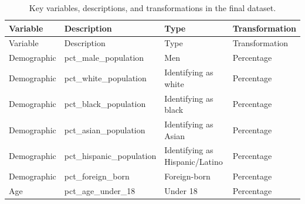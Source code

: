 \documentclass[
  number,
  review,
  3p]{elsarticle}
\begin{document}
\begin{longtable}[]{@{}
  >{\raggedright\arraybackslash}p{}
  >{\raggedright\arraybackslash}p{}
  >{\raggedright\arraybackslash}p{}
  >{\raggedright\arraybackslash}p{}@{}}
\caption{Key variables, descriptions, and transformations in the final
dataset.}\tabularnewline
\toprule\noalign{}
\begin{minipage}[b]{\linewidth}\raggedright
Variable
\end{minipage} & \begin{minipage}[b]{\linewidth}\raggedright
Description
\end{minipage} & \begin{minipage}[b]{\linewidth}\raggedright
Type
\end{minipage} & \begin{minipage}[b]{\linewidth}\raggedright
Transformation
\end{minipage} \\
\midrule\noalign{}
\endfirsthead
\toprule\noalign{}
\begin{minipage}[b]{\linewidth}\raggedright
Variable
\end{minipage} & \begin{minipage}[b]{\linewidth}\raggedright
Description
\end{minipage} & \begin{minipage}[b]{\linewidth}\raggedright
Type
\end{minipage} & \begin{minipage}[b]{\linewidth}\raggedright
Transformation
\end{minipage} \\
\midrule\noalign{}
\endhead
\bottomrule\noalign{}
\endlastfoot
Demographic & pct\_male\_population & Men & Percentage \\
Demographic & pct\_white\_population & Identifying as white &
Percentage \\
Demographic & pct\_black\_population & Identifying as black &
Percentage \\
Demographic & pct\_asian\_population & Identifying as Asian &
Percentage \\
Demographic & pct\_hispanic\_population & Identifying as Hispanic/Latino
& Percentage \\
Demographic & pct\_foreign\_born & Foreign-born & Percentage \\
Age & pct\_age\_under\_18 & Under 18 & Percentage \\

\end{longtable}
\end{document}

